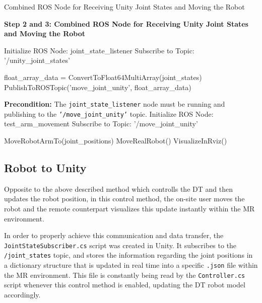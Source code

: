 \begin{algorithm}
    \caption{Combined ROS Node for Receiving Unity Joint States and Moving the Robot}\label{alg:combined_ros_node}
    \begin{algorithmic}[1]
        \State \textbf{Step 2 and 3: Combined ROS Node for Receiving Unity Joint States and Moving the Robot}
        
        \State Initialize ROS Node: joint\_state\_listener
        \State Subscribe to Topic: '/unity\_joint\_states'
        
            \State float\_array\_data = ConvertToFloat64MultiArray(joint\_states)
            \State PublishToROSTopic('move\_joint\_unity', float\_array\_data)
        \EndWhile
        
        \State \textbf{Precondition:} The \texttt{joint\_state\_listener} node must be running and publishing to the \texttt{'/move\_joint\_unity'} topic.
        \State Initialize ROS Node: test\_arm\_movement
        \State Subscribe to Topic: '/move\_joint\_unity'
        
            \State MoveRobotArmTo(joint\_positions)
                \State MoveRealRobot()
            \Else
                \State VisualizeInRviz()
            \EndIf
        \EndWhile
    \end{algorithmic}
\end{algorithm}


    
\subsection{Robot to Unity}

Opposite to the above described method which controlls the \ac{DT} and then updates the robot position, in this control method, the on-site user moves the robot and the remote counterpart visualizes this update instantly within the \ac{MR} environment.

In order to properly achieve this communication and data transfer, the \texttt{JointStateSubscriber.cs} script was created in Unity. It subscribes to the \texttt{/joint\_states} topic, and stores the information regarding the joint positions in a dictionary structure that is updated in real time into a specific \texttt{.json} file within the \ac{MR} environment. This file is constantly being read by the \texttt{Controller.cs} script whenever this control method is enabled, updating the \ac{DT} robot model accordingly.

